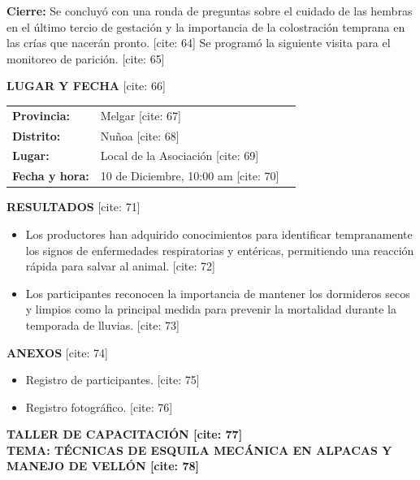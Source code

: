 \documentclass[11pt,a4paper]{article}
\begin{document}
\textbf{Cierre:} Se concluyó con una ronda de preguntas sobre el cuidado de las hembras en el último tercio de gestación y la importancia de la colostración temprana en las crías que nacerán pronto. [cite: 64] Se programó la siguiente visita para el monitoreo de parición. [cite: 65]

\vspace{0.3cm}
\textbf{LUGAR Y FECHA} [cite: 66]
\begin{tabular}{@{}lll@{}}
    \textbf{Provincia:}   & Melgar [cite: 67] \\
    \textbf{Distrito:}    & Nuñoa [cite: 68] \\
    \textbf{Lugar:}       & Local de la Asociación [cite: 69] \\
    \textbf{Fecha y hora:} & 10 de Diciembre, 10:00 am [cite: 70]
\end{tabular}

\vspace{0.3cm}
\textbf{RESULTADOS} [cite: 71]
\begin{itemize}
    \item Los productores han adquirido conocimientos para identificar tempranamente los signos de enfermedades respiratorias y entéricas, permitiendo una reacción rápida para salvar al animal. [cite: 72]
    \item Los participantes reconocen la importancia de mantener los dormideros secos y limpios como la principal medida para prevenir la mortalidad durante la temporada de lluvias. [cite: 73]
\end{itemize}

\textbf{ANEXOS} [cite: 74]
\begin{itemize}
    \item Registro de participantes. [cite: 75]
    \item Registro fotográfico. [cite: 76]
\end{itemize}

\newpage

\begin{center}
    \Large\bfseries TALLER DE CAPACITACIÓN [cite: 77] \\
    \large TEMA: TÉCNICAS DE ESQUILA MECÁNICA EN ALPACAS Y MANEJO DE VELLÓN [cite: 78]
\end{center}

\vspace{0.4cm}
\end{document}
